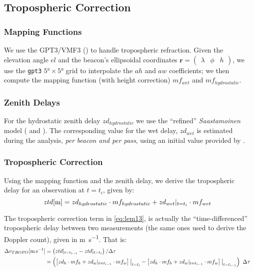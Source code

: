 \subsection{Tropospheric Correction}
\label{ssec-tropospheric-correction}

\subsubsection{Mapping Functions}
We use the GPT3/VMF3 (\cite{Landskron2018}) to handle tropospheric refraction. 
Given the elevation angle $el$ and the beacon's ellipsoidal coordinates 
$\bm{r}=\begin{pmatrix} \lambda & \phi & h\end{pmatrix}$, we use the \texttt{gpt3} 
$\ang{5} \times \ang{5}$ grid to interpolate the $ah$ and $aw$ coefficients; 
we then compute the mapping function (with height correction) $mf_{wet}$ and 
$mf_{hydrostatic}$.

\subsubsection{Zenith Delays}
For the hydrostatic zenith delay $zd_{hydrostatic}$ we use the ``refined'' 
\emph{Saastamoinen} model (\cite{Davisetal85} and \cite{Saastamoinen72}). 
The corresponding value for the wet delay, $zd_{wet}$ is estimated during the 
analysis, \emph{per beacon and per pass}, using an initial value provided by 
\cite{Askneetal87}.

\subsubsection{Tropospheric Correction}
Using the mapping function and the zenith delay, we derive the tropospheric 
delay for an observation at $t=t_i$, given by:
\begin{equation}
  ztd [\si{\m}] = zd_{hydrostatic} \cdot mf_{hydrostatic} + zd_{wet}\at{t=t_i} \cdot mf_{wet}
  \label{eq:tropo-delay}
\end{equation}

The tropospheric correction term in \ref{eq:lem13}, is actually the ``time-differenced'' 
tropospheric delay between two measurements (the same ones used to derive the 
Doppler count), given in \si{\m \per \s}. That is:
\begin{equation}
  \begin{aligned}
    \Delta v_{TROPO} [\si{\m \per \s}] 
      &= \left( ztd\at{t=t_{i-1}} - ztd\at{t=t_{i}} \right) / \Delta \tau\\
      &= \left( \left[ zd_{h} \cdot mf_{h} + zd_{w}\at{t=t_{i-1}} \cdot mf_{w} \right]\at[\big]{t=t_i} - 
        \left[ zd_{h} \cdot mf_{h} + zd_{w}\at{t=t_{i-1}} \cdot mf_{w} \right]\at[\big]{t=t_{i-1}} \right) \ \Delta \tau
    \label{eq:dtrop-diff}
  \end{aligned}
\end{equation}


